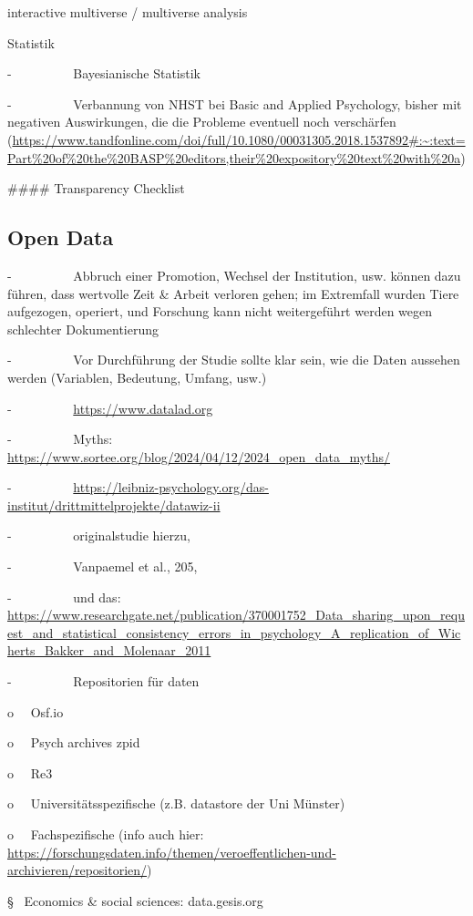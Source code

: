 \documentclass[
  letterpaper,
  DIV=11,
  numbers=noendperiod]{scrreprt}
\begin{document}
interactive multiverse / multiverse analysis

Statistik

-~~~~~~~~~ Bayesianische Statistik

-~~~~~~~~~ Verbannung von NHST bei Basic and Applied Psychology, bisher
mit negativen Auswirkungen, die die Probleme eventuell noch verschärfen
(\url{https://www.tandfonline.com/doi/full/10.1080/00031305.2018.1537892\#:~:text=Part\%20of\%20the\%20BASP\%20editors,their\%20expository\%20text\%20with\%20a})

\#\#\#\# Transparency Checklist

\subsection{Open Data}\label{open-data}

-~~~~~~~~~ Abbruch einer Promotion, Wechsel der Institution, usw. können
dazu führen, dass wertvolle Zeit \& Arbeit verloren gehen; im Extremfall
wurden Tiere aufgezogen, operiert, und Forschung kann nicht
weitergeführt werden wegen schlechter Dokumentierung

-~~~~~~~~~ Vor Durchführung der Studie sollte klar sein, wie die Daten
aussehen werden (Variablen, Bedeutung, Umfang, usw.)

-~~~~~~~~~ \url{https://www.datalad.org} ~

-~~~~~~~~~ Myths:
\url{https://www.sortee.org/blog/2024/04/12/2024_open_data_myths/}

-~~~~~~~~~
\url{https://leibniz-psychology.org/das-institut/drittmittelprojekte/datawiz-ii}

-~~~~~~~~~ originalstudie hierzu,

-~~~~~~~~~ Vanpaemel et al., 205,

-~~~~~~~~~ und das:
\url{https://www.researchgate.net/publication/370001752_Data_sharing_upon_request_and_statistical_consistency_errors_in_psychology_A_replication_of_Wicherts_Bakker_and_Molenaar_2011}

-~~~~~~~~~ Repositorien für daten

o~~ Osf.io

o~~ Psych archives zpid

o~~ Re3

o~~ Universitätsspezifische (z.B. datastore der Uni Münster)

o~~ Fachspezifische (info auch hier:
\url{https://forschungsdaten.info/themen/veroeffentlichen-und-archivieren/repositorien/})

§~ Economics \& social sciences: data.gesis.org
\end{document}
